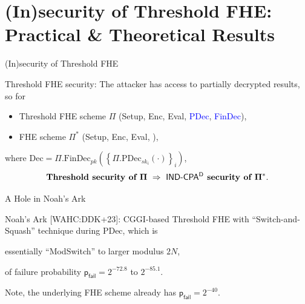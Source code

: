 \documentclass[handout]{beamer}
\begin{document}
\section{(In)security of Threshold FHE:\\ {\normalsize Practical \& Theoretical Results}}

	\begin{frame}{(In)security of Threshold FHE}

        Threshold FHE security: The attacker has access to partially decrypted results, so for\vspace{0.3cm}
		\begin{itemize}
			\item Threshold FHE scheme $\Pi$ (Setup, Enc, Eval, \textcolor{blue}{PDec}, \textcolor{blue}{FinDec}),
			\item FHE scheme $\Pi^*$ (Setup, Enc, Eval, ), 
		\end{itemize}
        where $\text{Dec}= \Pi.\text{FinDec}_{pk} \left(\left\{\Pi.\text{PDec}_{sk_i}(\cdot)\right\}_i\right)$, \vspace{0.3cm}
		\[\bf
            \textbf{Threshold security of } \Pi ~\Rightarrow~ \text{\sf IND-CPA$\sf ^D$} \textbf{ security of } \Pi^*.
        \]
	\end{frame}

	\begin{frame}{A Hole in Noah's Ark}

        Noah's Ark [WAHC:DDK+23]: CGGI-based Threshold FHE with ``Switch-and-Squash'' technique during PDec, which is
        \begin{center}
        essentially ``ModSwitch'' to larger modulus $2N$,
        \end{center}

        of failure probability $\mathsf{p}_\mathsf{fail} = 2^{-72.8}$ to $2^{-85.1}$.\vspace{0.3cm}\pause

        Note, the underlying FHE scheme already has $\mathsf{p}_\mathsf{fail} = 2^{-40}$. 
	\end{frame}
 
\end{document}
